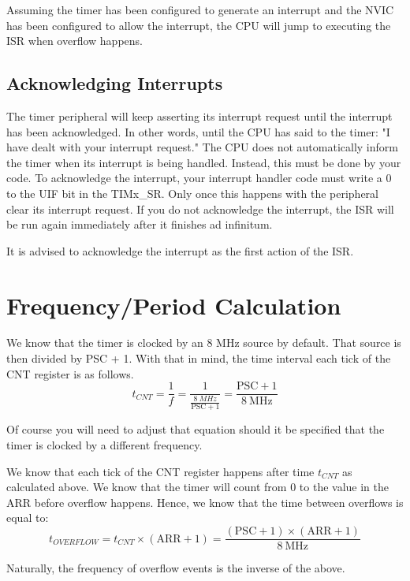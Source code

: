 Assuming the timer has been configured to generate an interrupt and the NVIC has been configured to allow the interrupt, the CPU will jump to executing the ISR when overflow happens.

\subsection{Acknowledging Interrupts} 
The timer peripheral will keep asserting its interrupt request until the interrupt has been acknowledged. 
In other words, until the CPU has said to the timer: "I have dealt with your interrupt request." 
The CPU does not automatically inform the timer when its interrupt is being handled.
Instead, this must be done by your code.
To acknowledge the interrupt, your interrupt handler code must write a 0 to the UIF bit in the TIMx\_SR.
Only once this happens with the peripheral clear its interrupt request.
If you do not acknowledge the interrupt, the ISR will be run again immediately after it finishes ad infinitum. 

It is advised to acknowledge the interrupt as the first action of the ISR.

\section{Frequency/Period Calculation}
We know that the timer is clocked by an 8 MHz source by default. That source is then divided by PSC + 1. With that in mind, the time interval each tick of the CNT register is as follows.
\begin{equation}
    t_{CNT} = \frac{1}{f} = \frac{1}{\frac{\SI{8}{MHz}}{\text{PSC} + 1}} = \frac{\text{PSC} + 1}{\SI{8}{\mega\hertz}}
\end{equation}

Of course you will need to adjust that equation should it be specified that the timer is clocked by a different frequency.

We know that each tick of the CNT register happens after time $t_{CNT}$ as calculated above. We know that the timer will count from 0 to the value in the ARR before overflow happens. 
Hence, we know that the time between overflows is equal to:
\begin{equation}
  t_{OVERFLOW} = t_{CNT} \times (\text{ARR} + 1) = \frac{(\text{PSC} + 1) \times (\text{ARR} + 1)}{\SI{8}{\mega\hertz}}
\end{equation}

Naturally, the frequency of overflow events is the inverse of the above.
